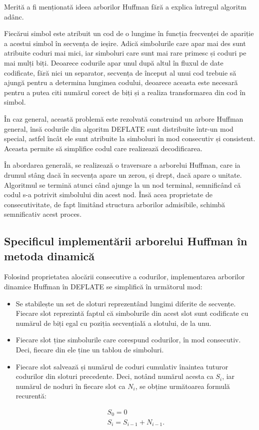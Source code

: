 \documentclass[a4paper,12pt]{report}
\begin{document}
Merită a fi menționată ideea arborilor Huffman fără a explica întregul algoritm adânc.

Fiecărui simbol este atribuit un cod de o lungime în funcția frecvenței de apariție a acestui simbol
în secvența de ieșire.
Adică simbolurile care apar mai des sunt atribuite coduri mai mici,
iar simboluri care sunt mai rare primesc și coduri pe mai mulți biți.
Deoarece codurile apar unul după altul în fluxul de date codificate,
fără nici un separator, secvența de început al unui cod trebuie să ajungă pentru a determina lungimea codului,
deoarece aceasta este necesară pentru a putea citi numărul corect de biți și a realiza transformarea din cod în simbol.

În caz general, această problemă este rezolvată construind un arbore Huffman general,
însă codurile din algoritm DEFLATE sunt distribuite într-un mod special,
astfel încât ele sunt atribuite la simboluri în mod consecutiv și consistent.
Aceasta permite să simplifice codul care realizează decodificarea.

În abordarea generală, se realizează o traversare a arborelui Huffman,
care ia drumul stâng dacă în secvența apare un zerou, și drept, dacă apare o unitate.
Algoritmul se termină atunci când ajunge la un nod terminal,
semnificând că codul s-a potrivit simbolului din acest nod.
Însă acea proprietate de consecutivitate,
de fapt limitând structura arborilor admisibile,
schimbă semnificativ acest proces.

\subsection{Specificul implementării arborelui Huffman în metoda dinamică}

Folosind proprietatea alocării consecutive a codurilor,
implementarea arborilor dinamice Huffman în DEFLATE se simplifică în următorul mod:
\begin{itemize}
    \item 
        Se stabilește un set de sloturi reprezentând lungimi diferite de secvențe.
        Fiecare slot reprezintă faptul că simbolurile din acest slot
        sunt codificate cu numărul de biți egal cu poziția secvențială a slotului, de la unu.
    \item
        Fiecare slot ține simbolurile care corespund codurilor, în mod consecutiv.
        Deci, fiecare din ele ține un tablou de simboluri.
    \item
        Fiecare slot salvează și numărul de coduri cumulativ înaintea tuturor codurilor din sloturi precedente.
        Deci, notând numărul acesta ca \( S_i \), iar numărul de noduri în fiecare slot ca \( N_i \),
        se obține următoarea formulă recurentă:

        \begin{gather*}
            S_0 = 0 \\
            S_i = S_{i - 1} + N_{i - 1}.
        \end{gather*}
\end{itemize}
\end{document}
